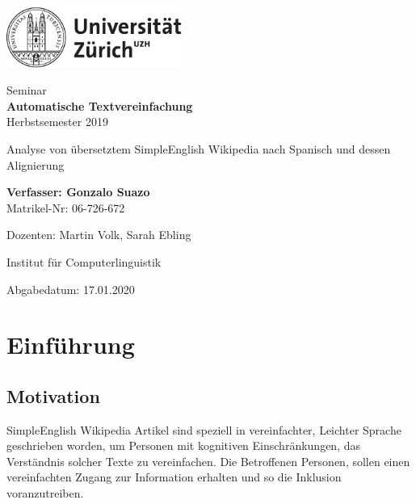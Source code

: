 \documentclass[11pt]{article}
\begin{document}
\begin{titlepage}
\includegraphics[height=20mm]{uzh_logo_d_pos}\\
\begin{center}

{\sffamily
Seminar \\
\textbf{Automatische Textvereinfachung} \\
Herbstsemester 2019 \\

\vspace{2cm}

{\Huge Analyse von übersetztem SimpleEnglish Wikipedia nach Spanisch und dessen Alignierung}\\

\vspace{4cm}

\textbf{Verfasser: Gonzalo Suazo} \\
	Matrikel-Nr: 06-726-672 \\

\vspace{2cm}

Dozenten:  Martin Volk, Sarah Ebling



Institut f\"ur Computerlinguistik

\vfill Abgabedatum: 17.01.2020

\vspace{3cm}
}
\end{center}

\end{titlepage}

\newpage





\section{Einführung}
\subsection{Motivation}
SimpleEnglish Wikipedia Artikel sind speziell in vereinfachter, Leichter Sprache geschrieben worden, um Personen mit kognitiven 
Einschränkungen, das Verständnis solcher Texte zu vereinfachen. Die Betroffenen Personen, sollen einen vereinfachten Zugang zur Information erhalten und so die Inklusion voranzutreiben. 
\end{document}
